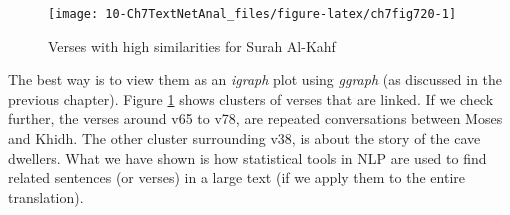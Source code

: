\documentclass[
]{article}
\newenvironment{Shaded}{\begin{snugshade}}{\end{snugshade}}
\newcommand{\AttributeTok}[1]{\textcolor[rgb]{0.13,0.29,0.53}{#1}}
\newcommand{\DecValTok}[1]{\textcolor[rgb]{0.00,0.00,0.81}{#1}}
\newcommand{\FloatTok}[1]{\textcolor[rgb]{0.00,0.00,0.81}{#1}}
\newcommand{\FunctionTok}[1]{\textcolor[rgb]{0.13,0.29,0.53}{\textbf{#1}}}
\newcommand{\NormalTok}[1]{#1}
\newcommand{\OtherTok}[1]{\textcolor[rgb]{0.56,0.35,0.01}{#1}}
\newcommand{\SpecialCharTok}[1]{\textcolor[rgb]{0.81,0.36,0.00}{\textbf{#1}}}
\newcommand{\StringTok}[1]{\textcolor[rgb]{0.31,0.60,0.02}{#1}}
\begin{document}
\begin{Shaded}
\end{Shaded}

\begin{figure}

{\centering \texttt{[image: 10-Ch7TextNetAnal\_files/figure-latex/ch7fig720-1]} 

}

\caption{Verses with high similarities for Surah Al-Kahf}\label{fig:ch7fig720}
\end{figure}

The best way is to view them as an \emph{igraph} plot using \emph{ggraph} (as discussed in the previous chapter). Figure \ref{fig:ch7fig720} shows clusters of verses that are linked. If we check further, the verses around v65 to v78, are repeated conversations between Moses and Khidh. The other cluster surrounding v38, is about the story of the cave dwellers. What we have shown is how statistical tools in NLP are used to find related sentences (or verses) in a large text (if we apply them to the entire translation).
\end{document}
